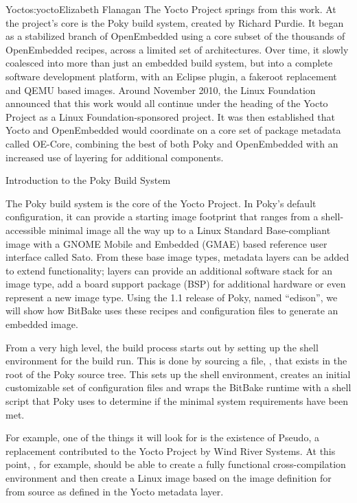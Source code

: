\begin{aosachapter}{Yocto}{s:yocto}{Elizabeth Flanagan}
The Yocto Project springs from this work. At the project's core is the
Poky build system, created by Richard Purdie. It began as a stabilized
branch of OpenEmbedded using a core subset of the thousands of
OpenEmbedded recipes, across a limited set of architectures. Over
time, it slowly coalesced into more than just an embedded build
system, but into a complete software development platform, with an
Eclipse plugin, a fakeroot replacement and QEMU based images. Around
November 2010, the Linux Foundation announced that this work would all
continue under the heading of the Yocto Project as a Linux Foundation-sponsored 
project. It was then established that Yocto and OpenEmbedded
would coordinate on a core set of package metadata called OE-Core,
combining the best of both Poky and OpenEmbedded with an increased use
of layering for additional components.

\begin{aosasect1}{Introduction to the Poky Build System}

The Poky build system is the core of the Yocto Project. In Poky's
default configuration, it can provide a starting image footprint that
ranges from a shell-accessible minimal image all the way up to a Linux
Standard Base-compliant image with a GNOME Mobile and Embedded (GMAE)
based reference user interface called Sato. From these base image
types, metadata layers can be added to extend functionality; layers
can provide an additional software stack for an image type, add a
board support package (BSP) for additional hardware or even represent
a new image type.  
Using the 1.1 release of Poky, named ``edison'',
we will show how BitBake uses these recipes and configuration
files to generate an embedded image. 

From a very high level, the build
process starts out by setting up the shell environment for the build
run. This is done by sourcing a file, , that exists
in the root of the Poky source tree. This sets up the shell
environment, creates an initial customizable set of configuration
files and wraps the BitBake runtime with a shell script that Poky uses
to determine if the minimal system requirements have been met.

For example, one of the things it will look for is the existence of
Pseudo, a  replacement contributed to the Yocto Project by
Wind River Systems. At this point, , for
example, should be able to create a fully functional cross-compilation
environment and then create a Linux image based on the image
definition for  from source as defined
in the Yocto metadata layer.


\end{aosasect1}
\end{aosachapter}
